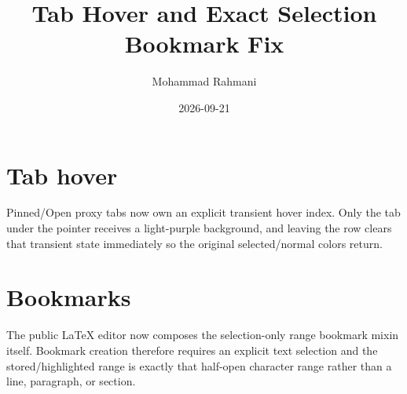 \documentclass[a4paper]{article}
\title{Tab Hover and Exact Selection Bookmark Fix}
\date{2026-09-21}
\author{Mohammad Rahmani}
\begin{document}
\maketitle
\begin{preview}
\section{Tab hover}
Pinned/Open proxy tabs now own an explicit transient hover index. Only the tab
under the pointer receives a light-purple background, and leaving the row clears
that transient state immediately so the original selected/normal colors return.
\section{Bookmarks}
The public LaTeX editor now composes the selection-only range bookmark mixin
itself. Bookmark creation therefore requires an explicit text selection and the
stored/highlighted range is exactly that half-open character range rather than a
line, paragraph, or section.
\end{preview}
\end{document}
